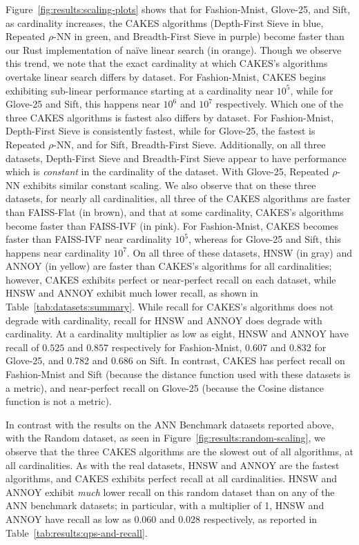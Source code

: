 Figure~\ref{fig:results:scaling-plots} shows that for Fashion-Mnist, Glove-25, and Sift, as cardinality increases, the CAKES algorithms (Depth-First Sieve in blue, Repeated $\rho$-NN in green, and Breadth-First Sieve in purple) become faster than our Rust implementation of na\"{i}ve linear search (in orange).
Though we observe this trend, we note that the exact cardinality at which CAKES's algorithms overtake linear search differs by dataset. For Fashion-Mnist, CAKES begins exhibiting sub-linear performance starting at a cardinality near $10^5$, while for Glove-25 and Sift, this happens near $10^6$ and $10^7$ respectively. 
Which one of the three CAKES algorithms is fastest also differs by dataset.
For Fashion-Mnist, Depth-First Sieve is consistently fastest, while for Glove-25, the fastest is Repeated $\rho$-NN, and for Sift, Breadth-First Sieve. 
Additionally, on all three datasets, Depth-First Sieve and Breadth-First Sieve appear to have performance which is \textit{constant} in the cardinality of the dataset. 
With Glove-25, Repeated $\rho$-NN exhibits similar constant scaling. 
We also observe that on these three datasets, for nearly all cardinalities, all three of the CAKES algorithms are faster than FAISS-Flat (in brown), and that at some cardinality, CAKES's algorithms become faster than FAISS-IVF (in pink). 
For Fashion-Mnist, CAKES becomes faster than FAISS-IVF near cardinality $10^5$, whereas for Glove-25 and Sift, this happens near cardinality $10^7$. 
On all three of these datasets, HNSW (in gray) and ANNOY (in yellow) are faster than CAKES's algorithms for all cardinalities; however, CAKES exhibits perfect or near-perfect recall on each dataset, while HNSW and ANNOY exhibit much lower recall, as shown in Table~\ref{tab:datasets:summary}.
While recall for CAKES's algorithms does not degrade with cardinality, recall for HNSW and ANNOY does degrade with cardinality. 
At a cardinality multiplier as low as eight, HNSW and ANNOY have recall of $0.525$ and $0.857$ respectively for Fashion-Mnist, 0.607 and 0.832 for Glove-25, and 0.782 and 0.686 on Sift. 
In contrast, CAKES has perfect recall on Fashion-Mnist and Sift (because the distance function used with these datasets is a metric), and near-perfect recall on Glove-25 (because the Cosine distance function is not a metric).


In contrast with the results on the ANN Benchmark datasets reported above, with the Random dataset, as seen in Figure~\ref{fig:results:random-scaling}, we observe that the three CAKES algorithms are the slowest out of all algorithms, at all cardinalities.
As with the real datasets, HNSW and ANNOY are the fastest algorithms, and CAKES exhibits perfect recall at all cardinalities.
HNSW and ANNOY exhibit \textit{much} lower recall on this random dataset than on any of the ANN benchmark datasets;
in particular, with a multiplier of 1, HNSW and ANNOY have recall as low as 0.060 and 0.028 respectively, as reported in Table~\ref{tab:results:qps-and-recall}.

